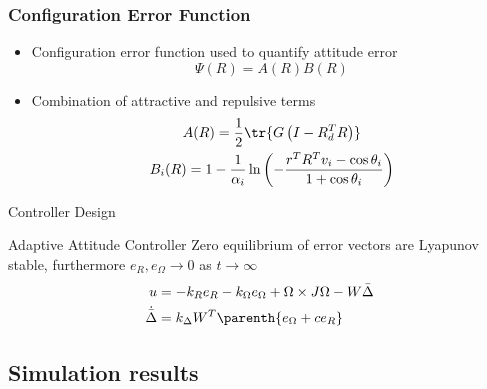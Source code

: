 \documentclass[11pt,professionalfonts]{beamer}
\begin{document}
\begin{frame}%
\frametitle{Configuration Error Function}
\begin{itemize}
	\item Configuration error function used to quantify attitude error
        \[
        	\Psi(R) = A(R) B(R) 
        \]
	\item Combination of attractive and repulsive terms   
        \begin{gather*}
        	A(R) = \frac{1}{2} \tr{G \left( I - R_d^T R\right)} \\
        	B_i(R) = 1 - \frac{1}{\alpha_i} \ln \left( - \frac{ r^T R^T v_i - \cos \theta_i}{1 + \cos \theta_i}\right)
        \end{gather*}
\end{itemize}
\end{frame} %

\begin{frame}{Controller Design} %
	\begin{block}{Adaptive Attitude Controller}
		Zero equilibrium of error vectors are Lyapunov stable, furthermore \( e_R , e_\Omega \to 0 \) as \( t \to \infty \)
		\begin{align*}
			u &= - k_R e_R - k_{\Omega} e_{\Omega} + \Omega \times J \Omega - W \bar{\Delta} \\
			\dot{\bar{\Delta}} &= k_\Delta W^T \parenth{ e_\Omega + c e_R }
		\end{align*}
	\end{block}
\end{frame}%

\subsection{Simulation results}
\end{document}

